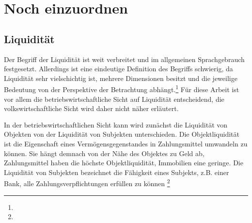 \seInhaltsverzeichnis[
einrueckung=ja,
gliederungsebenen=4
]






\chapter{Noch einzuordnen}
\section{Liquidität}

Der Begriff der Liquidität ist weit verbreitet und im allgemeinen Sprachgebrauch festgesetzt. Allerdings ist eine eindeutige Definition des Begriffs schwierig, da Liquidität sehr vielschichtig ist, mehrere Dimensionen besitzt und die jeweilige Bedeutung von der Perspektive der Betrachtung abhängt.\footnote{ } Für diese Arbeit ist vor allem die betriebswirtschaftliche Sicht auf Liquidität entscheidend, die volkswirtschaftliche Sicht wird daher nicht näher erläutert.

In der betriebswirtschaftlichen Sicht kann wird zunächst die Liquidität von Objekten von der Liquidität von Subjekten unterschieden. Die Objektliquidität ist die Eigenschaft eines Vermögensgegenstandes in Zahlungsmittel umwandeln zu können. Sie hängt demnach von der Nähe des Objektes zu Geld ab, Zahlungsmittel haben die höchste Objektliquidität, Immobilien eine geringe. Die Liquidität von Subjekten bezeichnet die Fähigkeit eines Subjekts, z.B. einer Bank, alle Zahlungsverpflichtungen erfüllen zu können \footnote{ }


